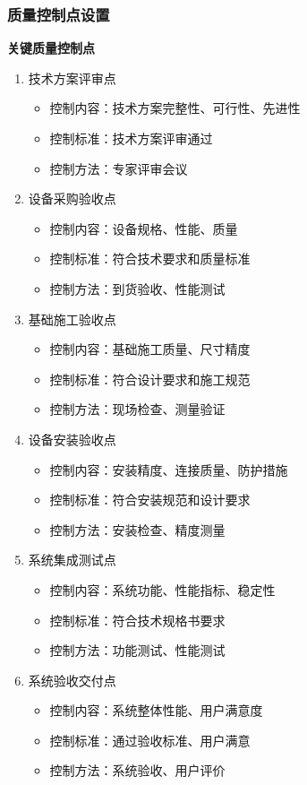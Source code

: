\documentclass[UTF8,a4paper,zihao=-4]{ctexart}
\begin{document}
\subsubsection{质量控制点设置}
\textbf{关键质量控制点}
\begin{enumerate}
    \item 技术方案评审点
    \begin{itemize}
        \item 控制内容：技术方案完整性、可行性、先进性
        \item 控制标准：技术方案评审通过
        \item 控制方法：专家评审会议
    \end{itemize}
    \item 设备采购验收点
    \begin{itemize}
        \item 控制内容：设备规格、性能、质量
        \item 控制标准：符合技术要求和质量标准
        \item 控制方法：到货验收、性能测试
    \end{itemize}
    \item 基础施工验收点
    \begin{itemize}
        \item 控制内容：基础施工质量、尺寸精度
        \item 控制标准：符合设计要求和施工规范
        \item 控制方法：现场检查、测量验证
    \end{itemize}
    \item 设备安装验收点
    \begin{itemize}
        \item 控制内容：安装精度、连接质量、防护措施
        \item 控制标准：符合安装规范和设计要求
        \item 控制方法：安装检查、精度测量
    \end{itemize}
    \item 系统集成测试点
    \begin{itemize}
        \item 控制内容：系统功能、性能指标、稳定性
        \item 控制标准：符合技术规格书要求
        \item 控制方法：功能测试、性能测试
    \end{itemize}
    \item 系统验收交付点
    \begin{itemize}
        \item 控制内容：系统整体性能、用户满意度
        \item 控制标准：通过验收标准、用户满意
        \item 控制方法：系统验收、用户评价
    \end{itemize}
\end{enumerate}
\end{document}
